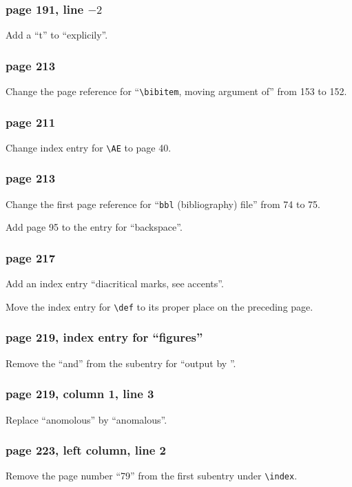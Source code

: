 \subsubsection*{page 191, line $-2$}
Add a ``t'' to ``explicily''.
 
\subsubsection*{page 213}
Change the page reference for ``\verb|\bibitem|, moving argument of''
from 153 to 152.
 
\subsubsection*{page 211}
Change index entry for \verb|\AE| to page 40.
 
\subsubsection*{page 213}
Change the first page reference for ``{\tt bbl} (bibliography) file''
from 74 to 75.
 
Add page 95 to the entry for ``backspace''.
 
\subsubsection*{page 217}
Add an index entry ``diacritical marks, see accents''.
 
Move the index entry for \verb|\def| to its proper place on the
preceding page.
 
\subsubsection*{page 219, index entry for ``figures''}
Remove the ``and'' from the subentry for ``output by
\verb||''.
 
\subsubsection*{page 219, column 1, line 3}
Replace ``anomolous'' by ``anomalous''.
 
\subsubsection*{page 223, left column, line 2}
Remove the page number ``79'' from the first subentry
under \verb|\index|.
 

